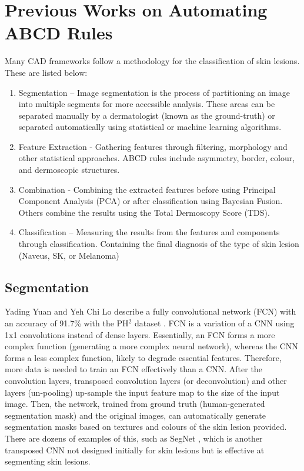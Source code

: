 \documentclass[10.5pt]{report}
\begin{document}
\section{Previous Works on Automating ABCD Rules}
Many CAD frameworks follow a methodology for the classification of skin lesions. These are listed below:

\begin{enumerate}
	
	\item Segmentation – Image segmentation is the process of partitioning an image into multiple segments for more accessible analysis. These areas can be separated manually by a dermatologist (known as the ground-truth) or separated automatically using statistical or machine learning algorithms.
	
	\item Feature Extraction - Gathering features through filtering, morphology and other statistical approaches. ABCD rules include asymmetry, border, colour, and dermoscopic structures.

	\item Combination - Combining the extracted features before using Principal Component Analysis (PCA) or after classification using Bayesian Fusion. Others combine the results using the Total Dermoscopy Score (TDS).
	
	\item Classification – Measuring the results from the features and components through classification. Containing the final diagnosis of the type of skin lesion (Naveus, SK, or Melanoma)

\end{enumerate}

\subsection{Segmentation}
Yading Yuan and Yeh Chi Lo describe a fully convolutional network (FCN) with an accuracy of 91.7\% with the PH$^2$ dataset \cite{Yuan2017a}. FCN is a variation of a CNN using 1x1 convolutions instead of dense layers. Essentially, an FCN forms a more complex function (generating a more complex neural network), whereas the CNN forms a less complex function, likely to degrade essential features. Therefore, more data is needed to train an FCN effectively than a CNN. After the convolution layers, transposed convolution layers (or deconvolution) and other layers (un-pooling) up-sample the input feature map to the size of the input image. Then, the network, trained from ground truth (human-generated segmentation mask) and the original images, can automatically generate segmentation masks based on textures and colours of the skin lesion provided. There are dozens of examples of this, such as SegNet \cite{Badrinarayanan2017}, which is another transposed CNN not designed initially for skin lesions but is effective at segmenting skin lesions.
\end{document}
